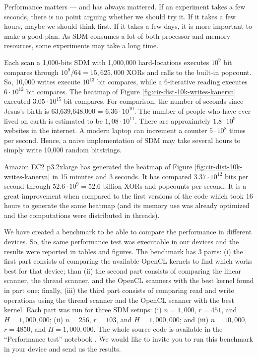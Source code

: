 
Performance matters --- and has always mattered. If an experiment takes a few seconds, there is no point arguing whether we should try it. If it takes a few hours, maybe we should think first. If it takes a few days, it is more important to make a good plan. As SDM consumes a lot of both processor and memory resources, some experiments may take a long time.

Each scan a 1,000-bits SDM with 1,000,000 hard-locations executes $10^9$ bit compares through $10^9/64 = 15,625,000$ XORs and calls to the built-in popcount. So, 10,000 writes execute $10^{13}$ bit compares, while a 6-iterative reading executes $6 \cdot 10^{12}$ bit compares. The heatmap of Figure \ref{fig:cir-dist-10k-writes-kanerva} executed $3.05 \cdot 10^{15}$ bit compares. For comparison, the number of seconds since Jesus's birth is 63,639,648,000 = $6.36 \cdot 10^{10}$. The number of people who have ever lived on earth is estimated to be $1,08 \cdot 10^{11}$. There are approximtely $1.8 \cdot 10^{9}$ websites in the internet. A modern laptop can increment a counter $5 \cdot 10^{8}$ times per second. Hence, a naive implementation of SDM may take several hours to simply write 10,000 random bitstrings.

Amazon EC2 p3.2xlarge has generated the heatmap of Figure \ref{fig:cir-dist-10k-writes-kanerva} in 15 minutes and 3 seconds. It has compared $3.37 \cdot 10^{12}$ bits per second through $52.6 \cdot 10^{9} = 52.6 \text{ billion}$ XORs and popcounts per second. It is a great improvement when compared to the first versions of the code which took 16 hours to generate the same heatmap (and its memory use was already optimized and the computations were distributed in threads).

We have created a benchmark to be able to compare the performance in different devices. So, the same performance test was executable in our devices and the results were reported in tables and figures. The benchmark has 3 parts: (i) the first part consists of comparing the available OpenCL kernels to find which works best for that device; than (ii) the second part consists of comparing the linear scanner, the thread scanner, and the OpenCL scanners with the best kernel found in part one; finally, (iii) the third part consists of comparing read and write operations using the thread scanner and the OpenCL scanner with the best kernel. Each part was run for three SDM setups: (i) $n=1,000$, $r=451$, and $H=1,000,000$; (ii) $n=256$, $r=103$, and $H=1,000,000$; and (iii) $n=10,000$, $r=4850$, and $H=1,000,000$. The whole source code is available in the ``Performance test'' notebook \citep{sdmframework}. We would like to invite you to run this benchmark in your device and send us the results.

